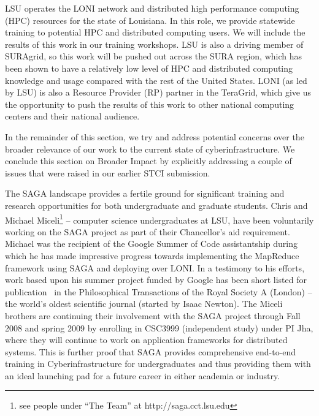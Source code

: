 \documentclass[10pt,letterpaper]{article}
\begin{document}
LSU operates the LONI network and distributed high performance
computing (HPC) resources for the state of Louisiana.  In this role,
we provide statewide training to potential HPC and distributed
computing users.  We will include the results of this work in our
training workshops.  LSU is also a driving member of SURAgrid, so this
work will be pushed out across the SURA region, which has been shown
to have a relatively low level of HPC and distributed computing
knowledge and usage compared with the rest of the United States.  LONI
(as led by LSU) is also a Resource Provider (RP) partner in the
TeraGrid, which give us the opportunity to push the results of this
work to other national computing centers and their national audience.

In the remainder of this section, we try and address potential
concerns over the broader relevance of our work to the current state
of cyberinfrastructure.  We conclude this section on Broader Impact by
explicitly addressing a couple of issues that were raised in our
earlier STCI submission.

The SAGA landscape provides a fertile ground for significant training
and research opportunities for both undergraduate and graduate
students.  Chris and Michael Miceli\footnote{see people under ``The
  Team'' at http://saga.cct.lsu.edu} -- computer science
undergraduates at LSU, have been voluntarily working on the SAGA
project as part of their Chancellor's aid requirement. Michael was the
recipient of the Google Summer of Code assistantship during which he
has made impressive progress towards implementing the MapReduce
framework using SAGA and deploying over LONI.  In a testimony to his
efforts, work based upon his summer project funded by Google has been
short listed for publication~\cite{escience_ahm08} in the Philosophical
Transactions of the Royal Society A (London) -- the world's oldest
scientific journal (started by Isaac Newton).  The Miceli brothers are
continuing their involvement with the SAGA project through Fall 2008
and spring 2009 by enrolling in CSC3999 (independent study) under PI
Jha, where they will continue to work on application frameworks for
distributed systems. This is further proof that SAGA provides
comprehensive end-to-end training in Cyberinfrastructure for
undergraduates and thus providing them with an ideal launching pad for a
future career in either academia or industry.

\end{document}
